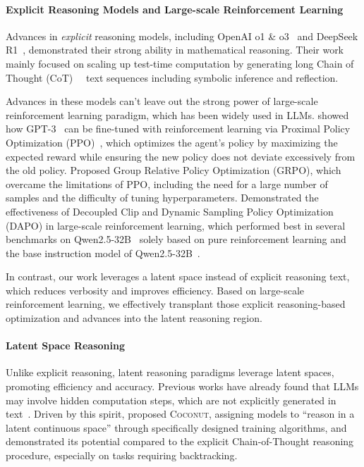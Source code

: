 \paragraph{Explicit Reasoning Models and Large-scale Reinforcement Learning}

Advances in \textit{explicit} reasoning models, including OpenAI o1 \& o3~\citep{openai2025o3o4mini, openai2024o1} and DeepSeek R1~\citep{deepseekai2025deepseekr1incentivizingreasoningcapability}, demonstrated their strong ability in mathematical reasoning.
Their work mainly focused on scaling up test-time computation by generating long Chain of Thought (CoT)~~\citep{NEURIPS2022_9d560961} text sequences including symbolic inference and reflection.

Advances in these models can't leave out the strong power of large-scale reinforcement learning paradigm, which has been widely used in LLMs.
\citet{ouyang2022traininglanguagemodelsfollow} showed how GPT-3~\citep{NEURIPS2022_8bb0d291} can be fine-tuned with reinforcement learning via Proximal Policy Optimization (PPO)~\citet{DBLP:journals/corr/SchulmanWDRK17}, which optimizes the agent's policy by maximizing the expected reward while ensuring the new policy does not deviate excessively from the old policy.
\citet{shao2024deepseekmathpushinglimitsmathematical} Proposed Group Relative Policy Optimization (GRPO), which overcame the limitations of PPO, including the need for a large number of samples and the difficulty of tuning hyperparameters.
\citet{yu2025dapoopensourcellmreinforcement} Demonstrated the effectiveness of Decoupled Clip and Dynamic Sampling Policy Optimization (DAPO) in large-scale reinforcement learning, which performed best in several benchmarks on Qwen2.5-32B~\citet{qwen2.5} solely based on pure reinforcement learning and the base instruction model of Qwen2.5-32B~\citep{qwen2.5}.

In contrast, our work leverages a latent space instead of explicit reasoning text, which reduces verbosity and improves efficiency.
Based on large-scale reinforcement learning, we effectively transplant those explicit reasoning-based optimization and advances into the latent reasoning region.

\paragraph{Latent Space Reasoning}
Unlike explicit reasoning, latent reasoning paradigms leverage latent spaces, promoting efficiency and accuracy.
Previous works have already found that LLMs may involve hidden computation steps, which are not explicitly generated in text~\citep{yang2024largelanguagemodelslatently, chen2023theoremqatheoremdrivenquestionanswering}.
Driven by this spirit, \citet{hao2024traininglargelanguagemodels}proposed \textsc{Coconut}, assigning models to ``reason in a latent continuous space'' through specifically designed training algorithms, and demonstrated its potential compared to the explicit Chain-of-Thought reasoning procedure, especially on tasks requiring backtracking.

